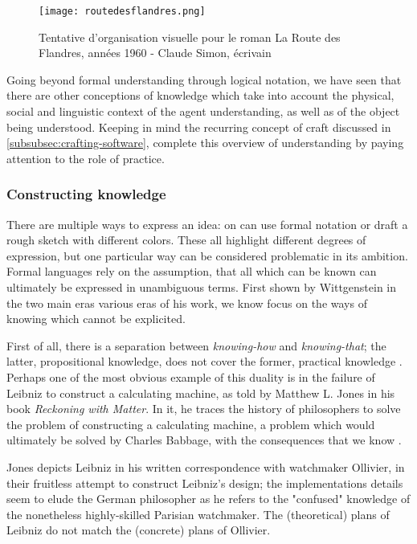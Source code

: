 \begin{figure}
    \texttt{[image: routedesflandres.png]}
    \caption{Tentative d'organisation visuelle pour le roman La Route des Flandres, années 1960 - Claude Simon, écrivain}
    \label{graphic:routedesflandres}
\end{figure}

Going beyond formal understanding through logical notation, we have seen that there are other conceptions of knowledge which take into account the physical, social and linguistic context of the agent understanding, as well as of the object being understood. Keeping in mind the recurring concept of craft discussed in \autoref{subsubsec:crafting-software}, complete this overview of understanding by paying attention to the role of practice.

\subsubsection{Constructing knowledge}
\label{subsubsec:constructing-knowledge}

There are multiple ways to express an idea: on can use formal notation or draft a rough sketch with different colors. These all highlight different degrees of expression, but one particular way can be considered problematic in its ambition. Formal languages rely on the assumption, that all which can be known can ultimately be expressed in unambiguous terms. First shown by Wittgenstein in the two main eras various eras of his work, we know focus on the ways of knowing which cannot be explicited.

First of all, there is a separation between \emph{knowing-how} and \emph{knowing-that}; the latter, propositional knowledge, does not cover the former, practical knowledge \citep{ryle_concept_1951}. Perhaps one of the most obvious example of this duality is in the failure of Leibniz to construct a calculating machine, as told by Matthew L. Jones in his book \emph{Reckoning with Matter}. In it, he traces the history of philosophers to solve the problem of constructing a calculating machine, a problem which would ultimately be solved by Charles Babbage, with the consequences that we know \citep{jones_reckoning_2016}.

Jones depicts Leibniz in his written correspondence with watchmaker Ollivier, in their fruitless attempt to construct Leibniz's design; the implementations details seem to elude the German philosopher as he refers to the "confused" knowledge of the nonetheless highly-skilled Parisian watchmaker. The (theoretical) plans of Leibniz do not match the (concrete) plans of Ollivier.

